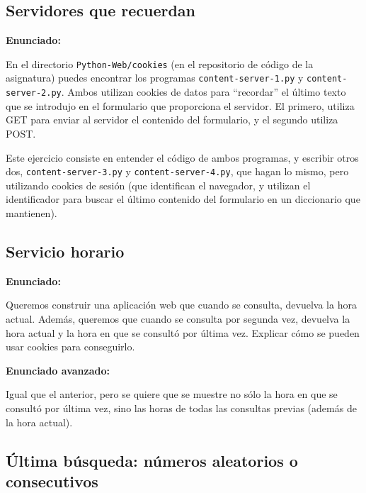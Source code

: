 \subsection{Servidores que recuerdan}
\label{subsec:servidores-recuerdan}

\textbf{Enunciado:}

En el directorio \verb|Python-Web/cookies| (en el repositorio de código de la asignatura) puedes encontrar los programas \verb|content-server-1.py| y \verb|content-server-2.py|. Ambos utilizan cookies de datos para ``recordar'' el último texto que se introdujo en el formulario que proporciona el servidor. El primero, utiliza GET para enviar al servidor el contenido del formulario, y el segundo utiliza POST.

Este ejercicio consiste en entender el código de ambos programas, y escribir otros dos, \verb|content-server-3.py| y \verb|content-server-4.py|, que hagan lo mismo, pero utilizando cookies de sesión (que identifican el navegador, y utilizan el identificador para buscar el último contenido del formulario en un diccionario que mantienen).

\subsection{Servicio horario}
\label{subsec:ej-servicio-horario}

\textbf{Enunciado:}

Queremos construir una aplicación web que cuando se consulta, devuelva la hora actual. Además, queremos que cuando se consulta por segunda vez, devuelva la hora actual y la hora en que se consultó por última vez. Explicar cómo se pueden usar cookies para conseguirlo.

\textbf{Enunciado avanzado:}

Igual que el anterior, pero se quiere que se muestre no sólo la hora en que se consultó por última vez, sino las horas de todas las consultas previas (además de la hora actual).

\subsection{Última búsqueda: números aleatorios o consecutivos}
\label{subsec:ultima-busqueda-aleconsec}

